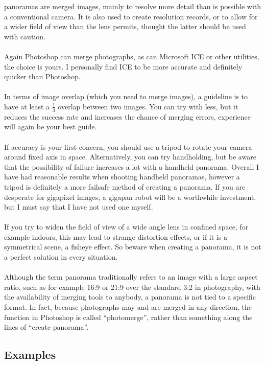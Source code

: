 \Glspl{panorama} are merged images, mainly to resolve more detail than is possible with a conventional camera. It is also used to create resolution records, or to allow for a wider field of view than the lens permits, thought the latter should be used with caution.
\\
\\
Again Photoshop can merge photographs, as can Microsoft ICE or other utilities, the choice is yours. I personally find ICE to be more accurate and definitely quicker than Photoshop.
\\
\\
In terms of image overlap (which you need to merge images), a guideline is to have at least a $\frac{1}{3}$ overlap between two images. You can try with less, but it reduces the success rate and increases the chance of merging errors, experience will again be your best guide.
\\
\\
If accuracy is your first concern, you should use a tripod to rotate your camera around fixed axis in space. Alternatively, you can try handholding, but be aware that the possibility of failure increases a lot with a handheld panorama. Overall I have had reasonable results when shooting handheld \glspl{panorama}, however a tripod is definitely a more failsafe method of creating a \gls{panorama}. If you are desperate for gigapixel images, a gigapan robot will be a worthwhile investment, but I must say that I have not used one myself.
\\
\\
If you try to widen the field of view of a wide angle lens in confined space, for example indoors, this may lead to strange distortion effects, or if it is a symmetrical scene, a fisheye effect. So beware when creating a \gls{panorama}, it is not a perfect solution in every situation.
\\
\\
Although the term \gls{panorama} traditionally refers to an image with a large aspect ratio, such as for example 16:9 or 21:9 over the standard 3:2 in photography, with the availability of merging tools to anybody, a \gls{panorama} is not tied to a specific format. In fact, because photographs may and are merged in any direction, the function in Photoshop is called ``\Gls{photomerge}'', rather than something along the lines of ``create \gls{panorama}''.

\subsection{Examples}

